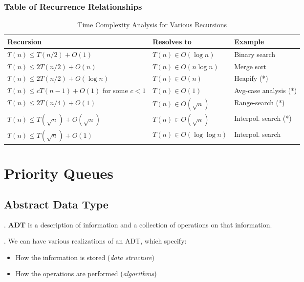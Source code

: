 \documentclass{article}
\begin{document}
\subsubsection{Table of Recurrence Relationships}


\begin{table}[h]
    \centering
    \caption{Time Complexity Analysis for Various Recursions}
    \label{tab:recursions}
    \begin{tabular}{>{\centering\arraybackslash}m{5cm} >{\centering\arraybackslash}m{3cm} >{\arraybackslash}m{4cm}}
    \toprule
    \textbf{Recursion} & \textbf{Resolves to} & \textbf{Example} \\
    \midrule
    $T(n) \leq T(n/2) + O(1)$ & $T(n) \in O(\log n)$ & Binary search \\
    $T(n) \leq 2T(n/2) + O(n)$ & $T(n) \in O(n \log n)$ & Merge sort \\
    $T(n) \leq 2T(n/2) + O(\log n)$ & $T(n) \in O(n)$ & Heapify (*) \\
    $T(n) \leq cT(n-1) + O(1)$ for some $c < 1$ & $T(n) \in O(1)$ & Avg-case analysis (*) \\
    $T(n) \leq 2T(n/4) + O(1)$ & $T(n) \in O(\sqrt{n})$ & Range-search (*) \\
    $T(n) \leq T(\sqrt{n}) + O(\sqrt{n})$ & $T(n) \in O(\sqrt{n})$ & Interpol. search (*) \\
    $T(n) \leq T(\sqrt{n}) + O(1)$ & $T(n) \in O(\log \log n)$ & Interpol. search \\
    \bottomrule
    \end{tabular}
\end{table}

\newpage

\section{Priority Queues} 

\subsection{Abstract Data Type }

\begin{deff}.
    \textbf{ADT} is a description of information and a collection of operations on that information.
\end{deff}

\begin{comm}[].
    We can have various realizations of an ADT, which specify: 
    \begin{itemize}
        \item How the information is stored (\textit{data structure}) 
        \item How the operations are performed (\textit{algorithms})
    \end{itemize}
\end{comm}
\end{document}
